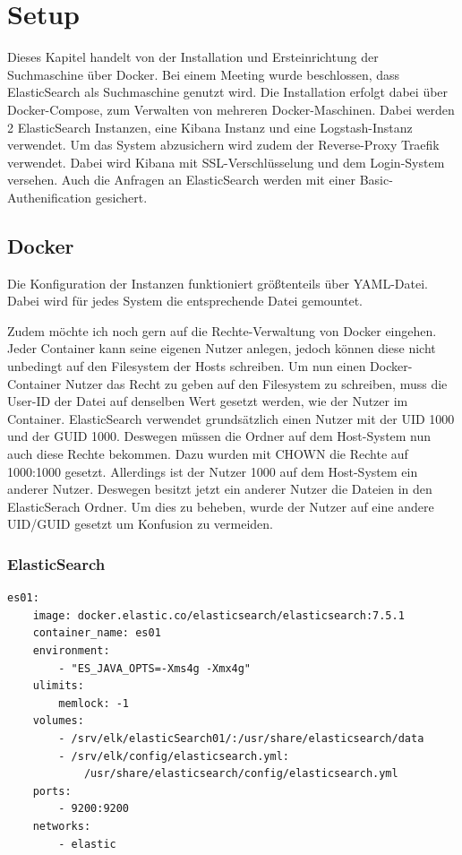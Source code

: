\chapter{Setup}

Dieses Kapitel handelt von der Installation und Ersteinrichtung der Suchmaschine über Docker. Bei einem Meeting wurde beschlossen, dass ElasticSearch als Suchmaschine genutzt wird. Die Installation erfolgt dabei über Docker-Compose, zum Verwalten von mehreren Docker-Maschinen. Dabei werden 2 ElasticSearch Instanzen, eine Kibana Instanz und eine Logstash-Instanz verwendet. Um das System abzusichern wird zudem der Reverse-Proxy Traefik verwendet. Dabei wird Kibana mit SSL-Verschlüsselung und dem Login-System versehen. Auch die Anfragen an ElasticSearch werden mit einer Basic-Authenification gesichert.

\section{Docker}

Die Konfiguration der Instanzen funktioniert größtenteils über YAML-Datei. Dabei wird für jedes System die entsprechende Datei gemountet. 

Zudem möchte ich noch gern auf die Rechte-Verwaltung von Docker eingehen. Jeder Container kann seine eigenen Nutzer anlegen, jedoch können diese nicht unbedingt auf den Filesystem der Hosts schreiben. Um nun einen Docker-Container Nutzer das Recht zu geben auf den Filesystem zu schreiben, muss die User-ID der Datei auf denselben Wert gesetzt werden, wie der Nutzer im Container. ElasticSearch verwendet grundsätzlich einen Nutzer mit der UID 1000 und der GUID 1000. Deswegen müssen die Ordner auf dem Host-System nun auch diese Rechte bekommen. Dazu wurden mit CHOWN die Rechte auf 1000:1000 gesetzt. Allerdings ist der Nutzer 1000 auf dem Host-System ein anderer Nutzer. Deswegen besitzt jetzt ein anderer Nutzer die Dateien in den ElasticSerach Ordner. Um dies zu beheben, wurde der Nutzer auf eine andere UID/GUID gesetzt um Konfusion zu vermeiden. \cite{JarrodWeaver.2014}

\subsection{ElasticSearch}

\begin{lstlisting}[language=XML, frame=single, label={lst:es01}] 
	es01:
	image: docker.elastic.co/elasticsearch/elasticsearch:7.5.1
	container_name: es01
	environment:
		- "ES_JAVA_OPTS=-Xms4g -Xmx4g"
	ulimits:
		memlock: -1
	volumes:
		- /srv/elk/elasticSearch01/:/usr/share/elasticsearch/data
		- /srv/elk/config/elasticsearch.yml:
			/usr/share/elasticsearch/config/elasticsearch.yml
	ports:
		- 9200:9200
	networks:
		- elastic
\end{lstlisting}

